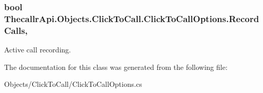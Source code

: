 \hypertarget{class_thecallr_api_1_1_objects_1_1_click_to_call_1_1_click_to_call_options_af5d2a462fe9021bf9401acf1bd14f542}{
\subsubsection[{Record\+Calls}]{\setlength{\rightskip}{0pt plus 5cm}bool Thecallr\+Api.\+Objects.\+Click\+To\+Call.\+Click\+To\+Call\+Options.\+Record\+Calls\hspace{0.3cm}{\ttfamily [get]}, {\ttfamily [set]}}}\label{class_thecallr_api_1_1_objects_1_1_click_to_call_1_1_click_to_call_options_af5d2a462fe9021bf9401acf1bd14f542}


Active call recording. 



The documentation for this class was generated from the following file\+:\begin{DoxyCompactItemize}
\item 
Objects/\+Click\+To\+Call/Click\+To\+Call\+Options.\+cs\end{DoxyCompactItemize}
